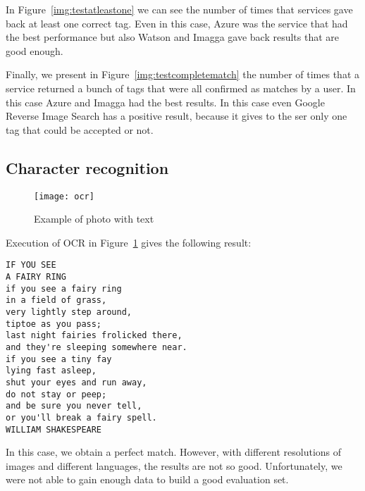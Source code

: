 In Figure~\ref{img:testatleastone} we can see the number of times that 
services gave back at least one correct tag. Even in this case, Azure was the 
service that had the best performance but also Watson and Imagga gave back 
results that are good enough.

Finally, we present in Figure~\ref{img:testcompletematch} the number of times 
that a service returned a bunch of tags that were all confirmed as matches by 
a user. In this case Azure and Imagga had the best results. In this case even 
Google Reverse Image Search has a positive result, because it gives to the ser 
only one tag that could be accepted or not.

\subsection{Character recognition}

\begin{figure}[H]
\centering
\texttt{[image: ocr]}
\caption{Example of photo with text}
\label{testOCR}
\end{figure}

Execution of OCR in Figure~\ref{testOCR} gives the following result:
\begin{lstlisting}
IF YOU SEE
A FAIRY RING
if you see a fairy ring
in a field of grass,
very lightly step around,
tiptoe as you pass;
last night fairies frolicked there,
and they're sleeping somewhere near.
if you see a tiny fay
lying fast asleep,
shut your eyes and run away,
do not stay or peep;
and be sure you never tell,
or you'll break a fairy spell.
WILLIAM SHAKESPEARE
\end{lstlisting}

In this case, we obtain a perfect match. However, with different resolutions 
of images and different languages, the results are not so good. Unfortunately, 
we were not able to gain enough data to build a good evaluation set.